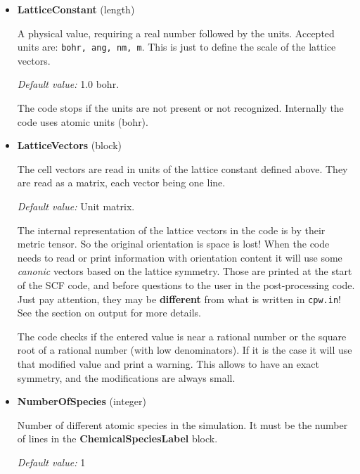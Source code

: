 \documentclass[11pt]{article}
\begin{document}
\begin{itemize}

\item{\bf LatticeConstant} (length)

  A physical value, requiring a real number followed by the units.
  Accepted units are: \texttt{bohr, ang, nm, m}.
  This is just to define the scale of the lattice vectors.

  \textit{Default value:} 1.0 bohr.

  The code stops if the units are not present or not recognized.
  Internally the code uses atomic units (bohr).

\item{\bf LatticeVectors} (block)

  The cell vectors are read in units of the lattice constant defined
  above.  They are read as a matrix, each
  vector being one line.

  \textit{Default value:}  Unit matrix.

  The internal representation of the lattice vectors in the code is
  by their metric tensor.  So the original orientation is space is lost!
  When the code needs to read or print information with
  orientation content it will use some {\it canonic} vectors
  based on the lattice symmetry.   Those are printed
  at the start of the SCF code, and before questions to the user
  in the post-processing code.  Just pay attention,
  they may be {\bf different} from what is written in \texttt{cpw.in}!
  See the section on output for more details.

  The code checks if the entered value is near a rational number or
  the square root of a rational number (with low denominators).
  If it is the case it will use that modified value and print a warning.
  This allows to have an exact symmetry, and the modifications are always
  small.


\item{\bf NumberOfSpecies} (integer)

  Number of different atomic species in the simulation.  It must be
  the number of lines in the {\bf ChemicalSpeciesLabel} block.

  \textit{Default value:}  1


\end{itemize}
\end{document}
